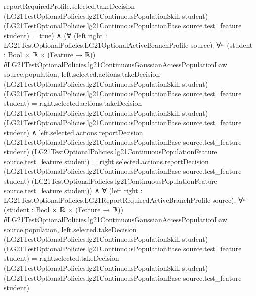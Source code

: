 \documentclass[10pt]{article}
\begin{document}
\begin{ReviewVerbatim}
                reportRequiredProfile.selected.takeDecision
                    (LG21TestOptionalPolicies.lg21ContinuousPopulationSkill student)
                    (LG21TestOptionalPolicies.lg21ContinuousPopulationBase source.test_feature student) =
                  true) ∧
            (∀ (left right : LG21TestOptionalPolicies.LG21OptionalActiveBranchProfile source),
                ∀ᵐ (student :
                  Bool ×
                    ℝ ×
                      (Feature →
                        ℝ)) ∂LG21TestOptionalPolicies.lg21ContinuousGaussianAccessPopulationLaw source.population,
                  left.selected.actions.takeDecision (LG21TestOptionalPolicies.lg21ContinuousPopulationSkill student)
                        (LG21TestOptionalPolicies.lg21ContinuousPopulationBase source.test_feature student) =
                      right.selected.actions.takeDecision
                        (LG21TestOptionalPolicies.lg21ContinuousPopulationSkill student)
                        (LG21TestOptionalPolicies.lg21ContinuousPopulationBase source.test_feature student) ∧
                    left.selected.actions.reportDecision
                        (LG21TestOptionalPolicies.lg21ContinuousPopulationBase source.test_feature student)
                        (LG21TestOptionalPolicies.lg21ContinuousPopulationFeature source.test_feature student) =
                      right.selected.actions.reportDecision
                        (LG21TestOptionalPolicies.lg21ContinuousPopulationBase source.test_feature student)
                        (LG21TestOptionalPolicies.lg21ContinuousPopulationFeature source.test_feature student)) ∧
              ∀ (left right : LG21TestOptionalPolicies.LG21ReportRequiredActiveBranchProfile source),
                ∀ᵐ (student :
                  Bool ×
                    ℝ ×
                      (Feature →
                        ℝ)) ∂LG21TestOptionalPolicies.lg21ContinuousGaussianAccessPopulationLaw source.population,
                  left.selected.takeDecision (LG21TestOptionalPolicies.lg21ContinuousPopulationSkill student)
                      (LG21TestOptionalPolicies.lg21ContinuousPopulationBase source.test_feature student) =
                    right.selected.takeDecision (LG21TestOptionalPolicies.lg21ContinuousPopulationSkill student)
                      (LG21TestOptionalPolicies.lg21ContinuousPopulationBase source.test_feature student)
\end{ReviewVerbatim}
\end{document}

